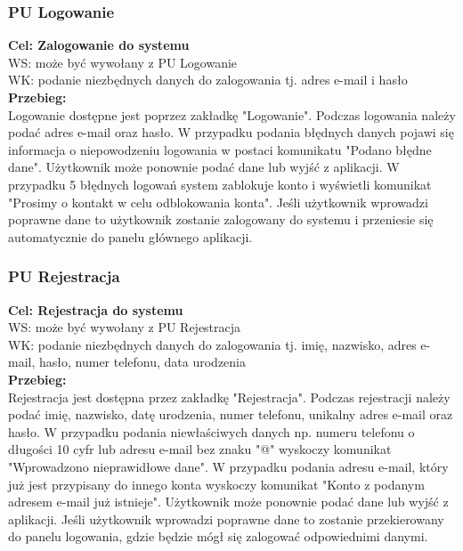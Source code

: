 \documentclass[12pt, letterpaper]{article}
\begin{document}
		
		
		\subsubsection{PU Logowanie}
		
		\quad
		
		\textbf{Cel: Zalogowanie do systemu}\\
		
		WS: może być wywołany z PU Logowanie\\
		
		WK: podanie niezbędnych danych do zalogowania tj. adres e-mail i hasło\\
		
		\textbf{Przebieg:}\\
		Logowanie dostępne jest poprzez zakładkę "Logowanie". Podczas logowania należy podać adres e-mail oraz hasło. W przypadku podania błędnych danych pojawi się informacja o niepowodzeniu logowania w postaci komunikatu "Podano błędne dane". Użytkownik może ponownie podać dane lub wyjść z aplikacji. W przypadku 5 błędnych logowań system zablokuje konto i wyświetli komunikat "Prosimy o kontakt w celu odblokowania konta". Jeśli użytkownik wprowadzi poprawne dane to użytkownik zostanie zalogowany do systemu i przeniesie się automatycznie do panelu głównego aplikacji.\\
		
		
		\subsubsection{PU Rejestracja}
		
		\quad
		
		\textbf{Cel: Rejestracja do systemu}\\
		
		WS: może być wywołany z PU Rejestracja\\
		
		WK: podanie niezbędnych danych do zalogowania tj. imię, nazwisko, adres e-mail, hasło, numer telefonu, data urodzenia\\
		
		\textbf{Przebieg:}\\
		Rejestracja jest dostępna przez zakładkę "Rejestracja". Podczas rejestracji należy podać imię, nazwisko, datę urodzenia, numer telefonu, unikalny adres e-mail oraz hasło. W przypadku podania niewłaściwych danych np. numeru telefonu o długości 10 cyfr lub adresu e-mail bez znaku "@" wyskoczy komunikat "Wprowadzono nieprawidłowe dane". W przypadku podania adresu e-mail, który już jest przypisany do innego konta wyskoczy komunikat "Konto z podanym adresem e-mail już istnieje". Użytkownik może ponownie podać dane lub wyjść z aplikacji. Jeśli użytkownik wprowadzi poprawne dane to zostanie przekierowany do panelu logowania, gdzie będzie mógł się zalogować odpowiednimi danymi. \\
		
\end{document}
